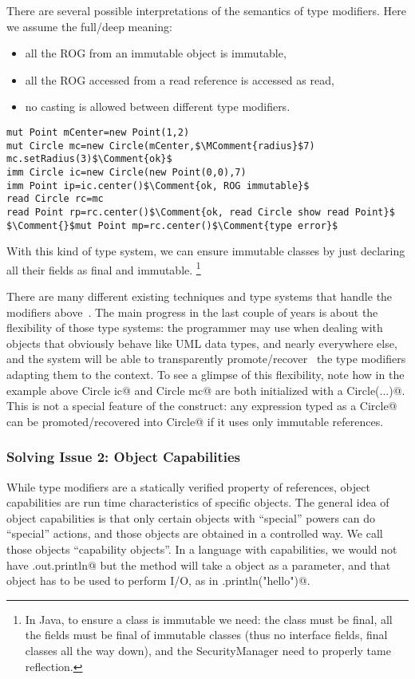 There are several possible interpretations of the semantics of type modifiers.
Here we assume the full/deep meaning:
\begin{itemize}
\item all the ROG from an immutable object is immutable,
\item all the ROG accessed from a read reference is accessed as read,
\item no casting is allowed between different type modifiers.
\end{itemize}
\saveSpace
\begin{lstlisting}
mut Point mCenter=new Point(1,2)
mut Circle mc=new Circle(mCenter,$\MComment{radius}$7)
mc.setRadius(3)$\Comment{ok}$
imm Circle ic=new Circle(new Point(0,0),7)
imm Point ip=ic.center()$\Comment{ok, ROG immutable}$
read Circle rc=mc
read Point rp=rc.center()$\Comment{ok, read Circle show read Point}$
$\Comment{}$mut Point mp=rc.center()$\Comment{type error}$ 
\end{lstlisting}
\saveSpace
With this kind of type system, we can ensure immutable classes by just declaring all their fields as final and immutable.%
\footnote{
In Java,  to ensure a class is immutable we need:
the class must be final, all the fields must be final of immutable
classes (thus no interface fields, final classes all the way down),
and the SecurityManager need to properly tame reflection.}

There are many different existing techniques and type systems that handle the modifiers above~\cite{ZibinEtAl10,ClarkeWrigstad03,HallerOdersky10,GordonEtAl12,ServettoZucca15}.
The main progress in the last couple of years is about the flexibility of those type systems: the programmer may use \Q@imm@ when dealing with objects that obviously behave like
 UML data types, and \Q@mut@ nearly everywhere else,
 and the system will be able to transparently promote/recover~\cite{GordonEtAl12,clebsch2015deny,ServettoZucca15}
 the type modifiers adapting them to the context.
To see a glimpse of this flexibility, note how in the example above \Q@imm Circle ic@ and
\Q@mut Circle mc@ are both initialized with a \Q@new Circle(...)@.
This is not a special feature of the \Q@new@ construct: any expression typed as a \Q@mut Circle@ can be promoted/recovered into \Q@imm Circle@ if it uses only immutable references.

\saveSpace
\subsubsection*{Solving Issue 2: Object Capabilities}
\saveSpace
While type modifiers are a statically verified property of references, object capabilities are run time characteristics of specific objects.
The general idea of object capabilities is that only certain objects with ``special'' powers can do ``special'' actions, and those objects are obtained in a controlled way.
We call those objects ``capability objects''.
In a language with capabilities, we would not have \Q@System.out.println@ but the \Q@main@ method will take a \Q@System@ object as a parameter, and that object has to be used to perform I/O, as in \Q@mySystem.println("hello")@.

